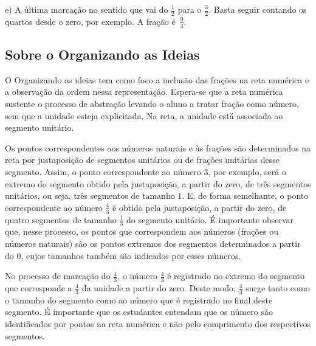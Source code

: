 e) A última marcação no sentido que vai do $\frac{1}{2}$ para o $\frac{3}{2}$. Basta seguir contando os quartos desde o zero, por exemplo. A fração é~$\frac{9}{4}$.
\vspace*{-.2cm}

\subsection{Sobre o Organizando as Ideias}

O Organizando as ideias tem como foco a inclusão das frações na reta numérica e a observação da ordem nessa representação. Espera-se que a reta numérica sustente o processo de abstração levando o aluno a tratar fração como número, sem que a unidade esteja explicitada. Na reta, a unidade está associada ao segmento unitário. 

Os pontos correspondentes aos números naturais e às frações são determinados na reta por justaposição de segmentos unitários ou de frações unitárias desse segmento. Assim, o ponto correspondente ao número $3$, por exemplo, será o extremo do segmento obtido pela justaposição, a partir do zero, de três segmentos unitários, ou seja, três segmentos de tamanho $1$. E, de forma semelhante, o ponto correspondente ao número $\frac{4}{3}$ é obtido pela justaposição, a partir do zero, de quatro segmentos de tamanho $\frac{1}{3}$ do segmento unitário. É importante observar que, nesse processo, os pontos que correspondem aos números (frações ou números naturais) são os pontos extremos dos segmentos determinados a partir do $0$, cujos tamanhos também são indicados por esses números.

No processo de marcação do $\frac{4}{3}$, o número $\frac{4}{3}$ é registrado no extremo do segmento que corresponde a $\frac{4}{3}$ da unidade a partir do zero.  Deste modo, $\frac{4}{3}$ surge tanto como o tamanho do segmento como ao número que é registrado no final deste segmento. É importante que os estudantes entendam que os número são identificados por pontos na reta numérica e não pelo comprimento dos respectivos segmentos. 

\begin{center}
  
\end{center}

